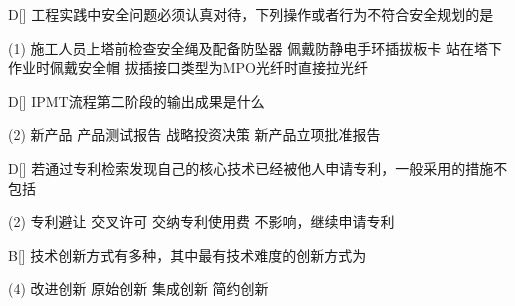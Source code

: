\begin{choice}{D}[]
    工程实践中安全问题必须认真对待，下列操作或者行为不符合安全规划的是
    \begin{tasks}(1)
        \task 施工人员上塔前检查安全绳及配备防坠器
        \task 佩戴防静电手环插拔板卡
        \task 站在塔下作业时佩戴安全帽
        \task 拔插接口类型为MPO光纤时直接拉光纤
    \end{tasks}
\end{choice}


\begin{choice}{D}[]
    IPMT流程第二阶段的输出成果是什么
    \begin{tasks}(2)
        \task 新产品
        \task 产品测试报告
        \task 战略投资决策
        \task 新产品立项批准报告
    \end{tasks}
\end{choice}


\begin{choice}{D}[]
    若通过专利检索发现自己的核心技术已经被他人申请专利，一般采用的措施不包括
    \begin{tasks}(2)
        \task 专利避让
        \task 交叉许可
        \task 交纳专利使用费
        \task 不影响，继续申请专利
    \end{tasks}
\end{choice}

\begin{choice}{B}[]
    技术创新方式有多种，其中最有技术难度的创新方式为
    \begin{tasks}(4)
        \task 改进创新
        \task 原始创新
        \task 集成创新
        \task 简约创新
    \end{tasks}
\end{choice}


